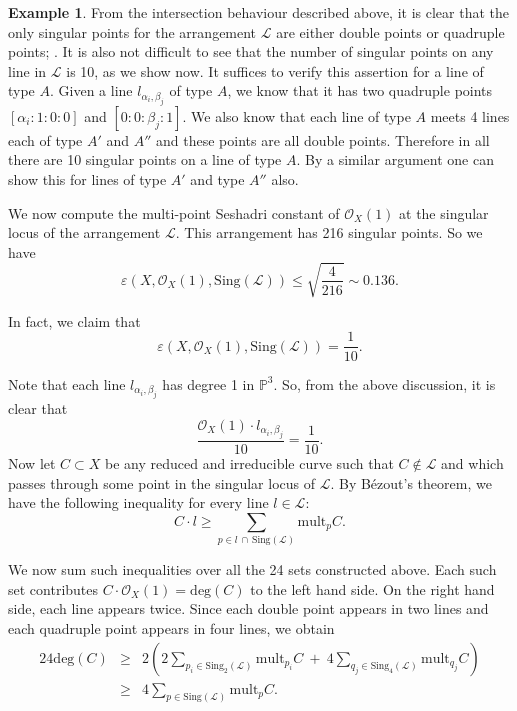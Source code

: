 \documentclass[12pt,reqno]{amsart}
\theoremstyle{plain}
\numberwithin{equation}{section}
\theoremstyle{definition}
\newtheorem{example}[theorem]{Example}
\begin{document}
\begin{example}
		
		From the intersection behaviour described above, it is clear that the only singular points for the arrangement $\mathcal{L}$ are either double points or quadruple points; \cite[Example 3.3]{Pok1}. It is also not difficult to see that the number of singular points on any line  in $\mathcal{L}$ is 10, as we show now. 
		It suffices to verify this assertion for a line of type $A$. Given a line $l_{\alpha_i,\beta_j}$ of type $A$, we know that it has two quadruple points $[\alpha_i :1 :0 :0]$ and $[0 :0 :\beta_j :1]$. We also know that each line of type $A$ meets 
		4 lines each of type $A'$ and $A''$ and these points are all double points. Therefore in all there are 10 singular points on a line of type $A$. By a similar argument one can show this for lines of type $A'$ and type $A''$ also.  
		
		We now compute the multi-point Seshadri constant of $\mathcal{O}_X(1)$ at the singular locus of 
		the arrangement $\mathcal{L}$.  This arrangement has 216 singular points. So we have 
		$$\varepsilon(X, \mathcal{O}_X(1), \text{Sing}(\mathcal{L})) \le \sqrt{\frac{4}{216}} \sim 0.136.$$
		
		In fact, we claim that
		\[
		\varepsilon(X, \mathcal{O}_X(1), \text{Sing}(\mathcal{L})) = \frac{1}{10}.
		\]
		
		
		
		Note that each line $l_{\alpha_i,\beta_j}$ has degree 1 in $\mathbb{P}^3$. So,  from the above discussion, it is clear that 
		\[
		\frac{\mathcal{O}_X(1)\cdot l_{\alpha_i,\beta_j}}{10} %
		= \frac{1}{10}.
		\]
		Now let $C \subset X$ be any reduced and irreducible curve such that $C \notin \mathcal{L}$ and which passes through some point in the singular locus of 
		$\mathcal{L}$. By B\'ezout's theorem, we have the following inequality for every line $l \in \mathcal{L}$:
		$$C \cdot l \ge \sum_{p \in l \,\cap \,\text{Sing} (\mathcal{L})} \text{mult}_p C.$$
		
		We now sum such inequalities over all the 24 sets constructed above. Each such set contributes $C\cdot \mathcal{O}_X(1) = \text{deg}(C)$ to the left hand side. On the right hand side, each line appears twice. Since each double point appears in two lines and each quadruple point appears in four lines, we obtain 
			\begin{eqnarray*}
				24 \text{deg}(C) &\geq& 2 \left(2\sum\limits_{p_i \in \text{Sing}_2(\mathcal{L})} \text{mult}_{p_i} C ~+~ 4\sum\limits_{q_j \in \text{Sing}_4(\mathcal{L})} \text{mult}_{q_j}C \right) \\
		 &\geq& 4 \sum\limits_{p \in\text{Sing}(\mathcal{L})} \text{mult}_{p}C.
		\end{eqnarray*}
		

\end{example}
\end{document}
